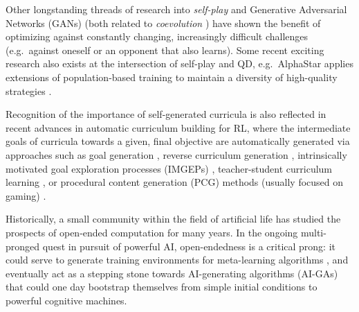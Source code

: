\documentclass{article}
\newcommand{\ks}[1]{\comments{\textcolor{purple}{[Ken: #1]}}}
\newcommand{\removed}[1]{\comments{\textcolor{gray}{\sout{#1}}}}
\newcommand{\comments}[1]{#1} %
\begin{document}
Other longstanding threads of research into \emph{self-play} \cite{samuel1967some, selfplay:arxiv18, silver2018general,openai2019dota, Balduzzi2019OpenendedLI} and Generative Adversarial Networks (GANs) \cite{goodfellow2014generative} (both related to \emph{coevolution} \cite{ficici:alife98,wiegand:gecco01,popovici:hnc12}) have shown the benefit of optimizing against constantly changing, increasingly difficult challenges (e.g.\ against oneself or an opponent that also learns). 
Some recent exciting research also exists at the intersection of self-play and QD, e.g.\ AlphaStar \cite{vinyals2019grandmaster} applies extensions of population-based training \cite{jaderberg2017population} to maintain a diversity of high-quality strategies \cite{arulkumaran2019alphastar}.

Recognition of the importance of self-generated curricula is also reflected in recent advances in automatic curriculum building for RL, where the intermediate goals of curricula towards a given, final objective are automatically generated via approaches such as goal generation \cite{florensa2018automatic}, reverse curriculum generation \cite{pmlr-v78-florensa17a}, intrinsically motivated goal exploration processes (IMGEPs) \cite{forestier2017intrinsically}, teacher-student curriculum learning \cite{matiisen2017teacher}, or procedural content generation (PCG) methods (usually focused on gaming) \cite{togelius:ieeetciaig11,shaker2016procedural, justesen2017procedural}. 

Historically, a small community within the field of artificial life \cite{standish:ijcia03,langdon:metas05, lehman:alife08,graening:ppsn10,soros:alife14, soros2:alife14, brant:mcc17, stanley2017open,ray:alife91,taylor:alife16}
has studied the prospects of open-ended computation for many years. In the ongoing multi-pronged quest in pursuit of powerful AI, open-endedness is a critical prong: it could serve to generate training environments for meta-learning algorithms \cite{finn2017model,duan2016rl,wang2016lRL}, and eventually act as a stepping stone towards AI-generating algorithms (AI-GAs) \cite{clune2019ai} that could one day bootstrap themselves from simple initial conditions to powerful cognitive machines.
\end{document}
